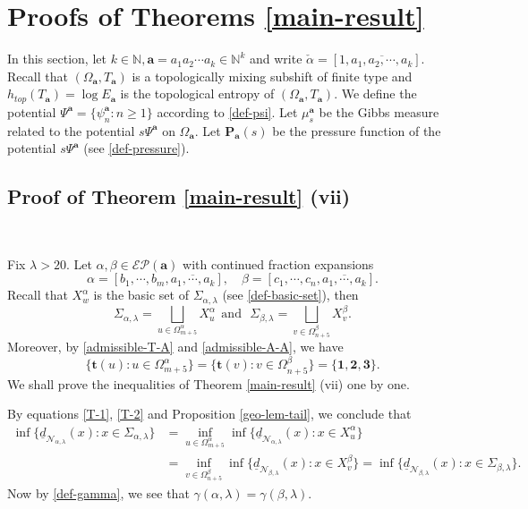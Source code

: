 \documentclass[reqno,11pt,graphicx,]{amsart}
\numberwithin{equation}{section}
\theoremstyle{plain}
\newcommand{\N}{{\mathbb N}}
\newcommand{\p}{\mathbf P}
\newcommand{\3}{\mathbf{3}}
\newcommand{\ma}{\mathbf{a}}
\begin{document}
	\section{Proofs of Theorems \ref{main-result}}\label{sec-main}
	
	In this section, let $k\in\N,\ma=a_1a_2\cdots a_k\in\N^k$ and write $
	\check{\alpha}=[1,\overline{a_1,a_2,\cdots,a_k}].$
	Recall that $(\Omega_{\ma},T_{\ma})$ is a topologically mixing subshift of finite type and $h_{top}(T_{\ma})=\log E_{\ma}$ is the topological entropy of $(\Omega_{\ma},T_{\ma})$. We define the potential $\Psi^{\ma}=\{\psi^{\ma}_n:n\geq1\}$ according to \eqref{def-psi}. Let $\mu^{\ma}_s$ be the Gibbs measure related to the potential $s\Psi^{\ma}$ on $\Omega_{\ma}$. Let $\p_{\ma}(s)$ be the pressure function of the potential $s\Psi^{\ma}$ (see \eqref{def-pressure}).
	\subsection{Proof of Theorem \ref{main-result} (vii)}\
	
	Fix $\lambda>20$. Let $\alpha,\beta\in\mathcal{EP}(\mathbf{a})$ with continued fraction expansions 
	$$\alpha=[b_1,\cdots,b_m,\overline{a_1,\cdots,a_k}],\quad
	\beta=[c_1,\cdots,c_n,\overline{a_1,\cdots,a_k}].$$ Recall that $X^{\alpha}_{w}$ is the basic set of $\Sigma_{\alpha,\lambda}$ (see \eqref{def-basic-set}), then 
	\begin{equation}\label{T-1}
		\Sigma_{\alpha,\lambda}=\bigsqcup_{u\in\Omega^{\alpha}_{m+5}}X_{u}^{\alpha} \ \ \text{and}\ \ \
		\Sigma_{\beta,\lambda}=\bigsqcup_{v\in\Omega^{\beta}_{n+5}}X_{v}^{\beta}.
	\end{equation}
	Moreover, by \eqref{admissible-T-A} and \eqref{admissible-A-A}, we have
	\begin{equation}\label{T-2}
		\{\mathbf{t}(u):u\in\Omega^{\alpha}_{m+5}\}= \{\mathbf{t}(v):v\in\Omega^{\beta}_{n+5}\}=\{\mathbf{1},\mathbf{2},\mathbf{3}\}.
	\end{equation}
	We shall prove the inequalities of Theorem \ref{main-result} (vii) one by one.
	
	By equations \eqref{T-1}, \eqref{T-2} and Proposition \ref{geo-lem-tail}, we conclude that
	\begin{align*}
		\inf\{\underline{d}_{\mathcal{N}_{\alpha,\lambda}}(x):x\in\Sigma_{\alpha,\lambda}\}&=\inf_{u\in\Omega^{\alpha}_{m+5}}\inf\{\underline{d}_{\mathcal{N}_{\alpha,\lambda}}(x):x\in X^{\alpha}_u\}\\
		&=\inf_{v\in\Omega^{\beta}_{n+5}}\inf\{\underline{d}_{\mathcal{N}_{\beta,\lambda}}(x):x\in X^{\beta}_v\}=\inf\{\underline{d}_{\mathcal{N}_{\beta,\lambda}}(x):x\in\Sigma_{\beta,\lambda}\}.
	\end{align*}
	Now by \eqref{def-gamma}, we see that $\gamma(\alpha,\lambda)=\gamma(\beta,\lambda)$.
	
\end{document}
